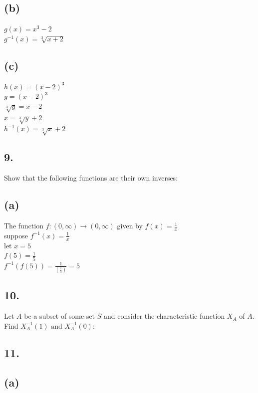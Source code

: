\documentclass[11pt]{article}
\begin{document}
\subsection*{(b)}
\begin{center}
$g(x) = x^{3} - 2$\\
\hfill \break
$g^{-1}(x) = \sqrt[3]{x+2}$
\end{center}

\subsection*{(c)}
\begin{center}
$h(x) = (x - 2)^{3}$\\
\hfill \break
$y = (x - 2)^{3}$\\
$\sqrt[3]{y} = x - 2$\\
$x = \sqrt[3]{y} + 2$\\
$h^{-1}(x) = \sqrt[3]{x} + 2$
\end{center}
%
%
\subsection*{9.}
\begin{center}
Show that the following functions are their own inverses:
\end{center}

\subsection*{(a)}
\begin{center}
The function $f : (0,\infty) \rightarrow (0,\infty)$ given by $f(x) = \frac{1}{x}$\\
\hfill \break
suppose $f^{-1}(x) = \frac{1}{x}$\\
let $x = 5$\\
$f(5) = \frac{1}{5}$\\
\hfill \break
$f^{-1}(f(5)) = \frac{1}{(\frac{1}{5})} = 5$
\end{center}
%
%
\subsection*{10.}
\begin{center}
Let $A$ be a subset of some set $S$ and consider the characteristic function $X_{A}$ of $A$.\\
Find $X_{A}^{-1}(1) \text { and } X_{A}^{-1}(0)$:\\
\hfill \break

\end{center}
%
%
\subsection*{11.}
\begin{center}

\end{center}

\subsection*{(a)}
\begin{center}

\hfill \break

\end{center}
\end{document}
